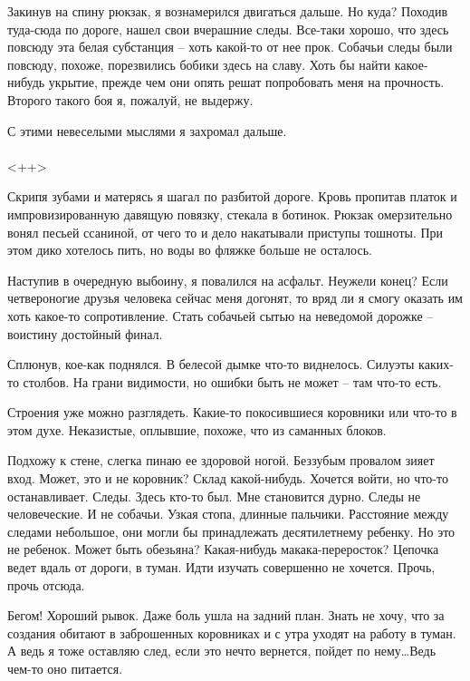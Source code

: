 \documentclass[a4paper]{book}
\begin{document}
Закинув на спину рюкзак, я вознамерился двигаться дальше. Но куда? Походив туда-сюда по дороге, нашел свои вчерашние следы. Все-таки хорошо, что здесь повсюду эта белая субстанция -- хоть какой-то от нее прок. Собачьи следы были повсюду, похоже, порезвились бобики здесь на славу. Хоть бы найти какое-нибудь укрытие, прежде чем они опять решат попробовать меня на прочность. Второго такого боя я, пожалуй, не выдержу.

С этими невеселыми мыслями я захромал дальше.
\\
\paragraph{}<++>


Скрипя зубами и матерясь я шагал по разбитой дороге. Кровь пропитав платок и импровизированную давящую повязку, стекала в ботинок. Рюкзак омерзительно вонял песьей ссаниной, от чего то и дело накатывали приступы тошноты. При этом дико хотелось пить, но воды во фляжке больше не осталось.

Наступив в очередную выбоину, я повалился на асфальт. Неужели конец? Если четвероногие друзья человека сейчас меня догонят, то вряд ли я смогу оказать им хоть какое-то сопротивление. Стать собачьей сытью на неведомой дорожке -- воистину достойный финал. 

Сплюнув, кое-как поднялся. В белесой дымке что-то виднелось. Силуэты каких-то столбов. На грани видимости, но ошибки быть не может -- там что-то есть. 

Строения уже можно разглядеть. Какие-то покосившиеся коровники или что-то в этом духе. Неказистые, оплывшие, похоже, что из саманных блоков. 

Подхожу к стене, слегка пинаю ее здоровой ногой. Беззубым провалом зияет вход. Может, это и не коровник? Склад какой-нибудь. Хочется войти, но что-то останавливает. Следы. Здесь кто-то был.  Мне становится дурно. Следы не человеческие. И не собачьи. Узкая стопа, длинные пальчики. Расстояние между следами небольшое, они могли бы принадлежать десятилетнему ребенку. Но это не ребенок. Может быть обезьяна? Какая-нибудь макака-переросток? Цепочка ведет вдаль от дороги, в туман. Идти изучать совершенно не хочется. Прочь, прочь отсюда. 

Бегом! Хороший рывок. Даже боль ушла на задний план. Знать не хочу, что за создания обитают в заброшенных коровниках и с утра уходят на работу в туман. А ведь я тоже оставляю след, если это нечто вернется, пойдет по нему\ldots Ведь чем-то оно питается. 
\end{document}
